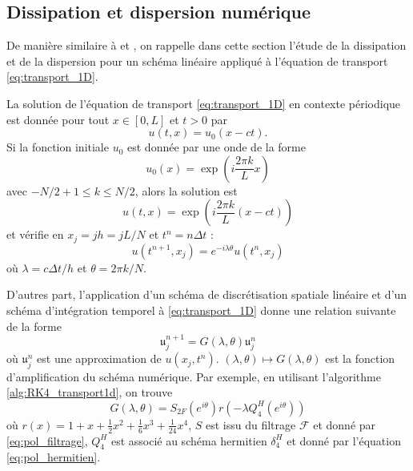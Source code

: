 \subsection{Dissipation et dispersion numérique}

De manière similaire à \cite{Desquesnes2007} et \cite{Dubois2016}, on rappelle dans cette section l'étude de la dissipation et de la dispersion pour un schéma linéaire appliqué à l'équation de transport \eqref{eq:transport_1D}.

La solution de l'équation de transport \eqref{eq:transport_1D} en contexte périodique est donnée pour tout $x \in [0,L]$ et $t>0$ par
\begin{equation}
u(t,x)=u_0(x-ct).
\end{equation}
Si la fonction initiale $u_0$ est donnée par une onde de la forme 
\begin{equation}
u_0(x) = \exp \left( i \dfrac{2 \pi k}{L} x \right)
\end{equation}
avec $-N/2 +1 \leq k \leq N/2 $, alors la solution est
\begin{equation}
u(t,x) = \exp \left( i \dfrac{2 \pi k}{L} (x-ct) \right)
\end{equation}
et vérifie en $x_j = j h = j L/N$ et $t^n = n \Delta t$ :
\begin{equation}
u(t^{n+1},x_j) = e^{-i \lambda \theta} u(t^n,x_j)
\label{eq:e(ilambdateta)}
\end{equation}
où $\lambda = c \Delta t /h$ et $\theta = 2 \pi k / N$.

D'autres part, l'application d'un schéma de discrétisation spatiale linéaire et d'un schéma d'intégration temporel à \eqref{eq:transport_1D} donne une relation suivante de la forme
\begin{equation}
\mathfrak{u}_j^{n+1} = G(\lambda, \theta) \mathfrak{u}_j^n
\end{equation}
où $\mathfrak{u}_j^n$ est une approximation de $u(x_j, t^n)$.
$(\lambda,\theta)\mapsto G(\lambda,\theta)$ est la fonction d'amplification du schéma numérique.
Par exemple, en utilisant l'algorithme \ref{alg:RK4_transport1d}, on trouve
\begin{equation}
G(\lambda, \theta) = S_{2F}(e^{i \theta}) r(- \lambda Q^H_{4}(e^{i \theta}) )
\end{equation}
où $r(x) =  1 + x + \frac{1}{2}x^2 + \frac{1}{6}x^3 + \frac{1}{24}x^4$, $S$ est issu du filtrage $\mathcal{F}$ et donné par \eqref{eq:pol_filtrage}, $Q_4^H$ est associé au schéma hermitien $\delta_4^H$ et donné par l'équation \eqref{eq:pol_hermitien}.

